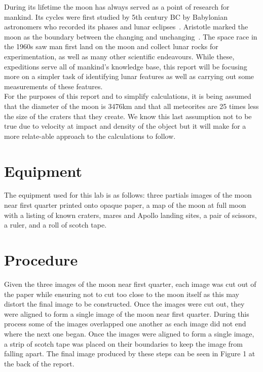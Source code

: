 \documentclass{article}
\begin{document}
During its lifetime the moon has always served as a point of research for mankind. Its cycles were first studied by 5th 
century BC by Babylonian astronomers who recorded its phases and lunar eclipses~\cite{Aaboe:1999}. Aristotle marked
the moon as the boundary between the changing and unchanging~\cite{Lewis:1964}. The space race in the 1960s saw man
first land on the moon and collect lunar rocks for experimentation, as well as many other scientific endeavours. While these,
expeditions serve all of mankind's knowledge base, this report will be focusing more on a simpler task of identifying lunar
features as well as carrying out some measurements of these features.\\

For the purposes of this report and to simplify calculations, it is being assumed that the diameter of the moon is 3476km
and that all meteorites are 25 times less the size of the craters that they create. We know this last assumption not to be
true due to velocity at impact and density of the object but it will make for a more relate-able approach to the calculations 
to follow.\\




\section{Equipment}

The equipment used for this lab is as follows: three partials images of the moon near first quarter printed onto opaque paper, a map of the moon
at full moon with a listing of known craters, mares and Apollo landing sites,  a pair of scissors, a ruler,
and a roll of scotch tape.


\section{Procedure}

Given the three images of the moon near first quarter, each image was cut out of the paper while ensuring not to cut too close to the moon 
itself as this may distort the final image to be constructed. Once the images were cut out, they were aligned to form a single image of the moon
near first quarter. During this process some of the images overlapped one another as each image did not end where the next one began. Once
the images were aligned to form a single image, a strip of scotch tape was placed on their boundaries to keep the image from falling apart.
The final image produced by these steps can be seen in Figure 1 at the back of the report.\\
\end{document}
